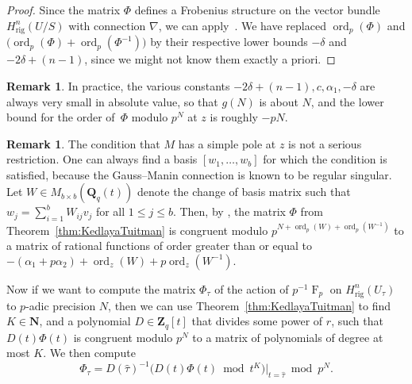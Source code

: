 \documentclass[a4paper,11pt]{article}
\numberwithin{equation}{section}
\newcommand{\NN}{\mathbf{N}} %
\newcommand{\ZZ}{\mathbf{Z}} %
\newcommand{\QQ}{\mathbf{Q}} %
\DeclareMathOperator{\ord}{ord}          %
\DeclareMathOperator{\Frob}{F}           %
\providecommand{\Hrig}{H_{\text{rig}}}  %
\theoremstyle{definition}
\newtheorem{rem}[thm]{Remark}
\begin{document}
\begin{proof}
Since the matrix $\Phi$ defines a Frobenius structure on the vector bundle $\Hrig^n(U/S)$ with
connection $\nabla$, we can apply~\citep[Theorem~2.1]{KedlayaTuitman2012}. We have 
replaced $\ord_p(\Phi)$ and $ \bigl( \ord_p(\Phi)+\ord_p(\Phi^{-1}) \bigr)$ by their respective lower bounds 
$-\delta$ and $-2 \delta + (n-1)$, since we might not know them exactly a priori.
\end{proof}

\begin{rem}
In practice, the various constants $-2 \delta + (n-1), c, \alpha_1, -\delta$ are always very small
in absolute value, so that $g(N)$ is about $N$, and the lower bound for the order of~$\Phi$ 
modulo $p^N$ at $z$ is roughly $-pN$.
\end{rem}

\begin{rem}
The condition that $M$ has a simple pole at $z$ is not a serious restriction. One can always 
find a basis $[w_1, \ldots, w_b]$ for which the condition is satisfied, because the Gauss--Manin 
connection is known to be regular singular. Let $W \in M_{b \times b}(\QQ_q(t))$ denote the 
change of basis matrix such that $w_j = \sum_{i=1}^b W_{ij} v_j$ for all $1 \leq j \leq b$. Then, 
by \citep[Corollary 2.6]{KedlayaTuitman2012}, the matrix $\Phi$ from
Theorem~\ref{thm:KedlayaTuitman} is congruent modulo 
$p^{N+\ord_p(W)+\ord_p(W^{-1})}$ 
to a matrix of rational functions of order greater than 
or equal to 
$-(\alpha_1+p \alpha_2)+\ord_z(W)+p\ord_z(W^{-1}).$ 
\end{rem}


Now if we want to compute the matrix $\Phi_{\tau}$ of the action of $p^{-1} \Frob_p$ on 
$\Hrig^{n}(U_{\tau})$ to $p$-adic precision $N$, then we can use Theorem~\ref{thm:KedlayaTuitman} 
to find $K \in \NN$, and a polynomial $D \in \ZZ_q[t]$ that divides some power of $r$, such that 
$D(t) \Phi(t)$ is congruent modulo $p^N$ to a matrix of polynomials of degree at most $K$. 
We then compute
\begin{equation*}
\Phi_{\tau} = D(\hat{\tau})^{-1} \bigl( D(t) \Phi(t) \bmod{t^{K}} \bigr)|_{t=\hat{\tau}} \bmod{p^{N}}.
\end{equation*}
\end{document}
